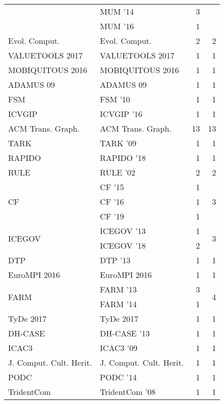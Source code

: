 \begin{table*}[t]
\begin{tabular}{llrr}
& MUM '14 & 3 &\\
& MUM '16 & 1 &\\
\multirow{1}{*}{Evol. Comput.} & Evol. Comput. & 2 & \multirow{1}{*}{2}\\
\multirow{1}{*}{VALUETOOLS 2017} & VALUETOOLS 2017 & 1 & \multirow{1}{*}{1}\\
\multirow{1}{*}{MOBIQUITOUS 2016} & MOBIQUITOUS 2016 & 1 & \multirow{1}{*}{1}\\
\multirow{1}{*}{ADAMUS 09} & ADAMUS 09 & 1 & \multirow{1}{*}{1}\\
\multirow{1}{*}{FSM } & FSM '10 & 1 & \multirow{1}{*}{1}\\
\multirow{1}{*}{ICVGIP } & ICVGIP '16 & 1 & \multirow{1}{*}{1}\\
\multirow{1}{*}{ACM Trans. Graph.} & ACM Trans. Graph. & 13 & \multirow{1}{*}{13}\\
\multirow{1}{*}{TARK } & TARK '09 & 1 & \multirow{1}{*}{1}\\
\multirow{1}{*}{RAPIDO } & RAPIDO '18 & 1 & \multirow{1}{*}{1}\\
\multirow{1}{*}{RULE } & RULE '02 & 2 & \multirow{1}{*}{2}\\
\multirow{3}{*}{CF } & CF '15 & 1 & \multirow{3}{*}{3}\\
& CF '16 & 1 &\\
& CF '19 & 1 &\\
\multirow{2}{*}{ICEGOV } & ICEGOV '13 & 1 & \multirow{2}{*}{3}\\
& ICEGOV '18 & 2 &\\
\multirow{1}{*}{DTP } & DTP '13 & 1 & \multirow{1}{*}{1}\\
\multirow{1}{*}{EuroMPI 2016} & EuroMPI 2016 & 1 & \multirow{1}{*}{1}\\
\multirow{2}{*}{FARM } & FARM '13 & 3 & \multirow{2}{*}{4}\\
& FARM '14 & 1 &\\
\multirow{1}{*}{TyDe 2017} & TyDe 2017 & 1 & \multirow{1}{*}{1}\\
\multirow{1}{*}{DH-CASE } & DH-CASE '13 & 1 & \multirow{1}{*}{1}\\
\multirow{1}{*}{ICAC3 } & ICAC3 '09 & 1 & \multirow{1}{*}{1}\\
\multirow{1}{*}{J. Comput. Cult. Herit.} & J. Comput. Cult. Herit. & 1 & \multirow{1}{*}{1}\\
\multirow{1}{*}{PODC } & PODC '14 & 1 & \multirow{1}{*}{1}\\
\multirow{1}{*}{TridentCom } & TridentCom '08 & 1 & \multirow{1}{*}{1}\\

\end{tabular}
\end{table*}
